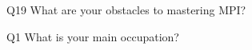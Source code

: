 \begin{description}%
\item{Q19} What are your obstacles to mastering MPI?%
\item{Q1} What is your main occupation?%
\end{description}%
